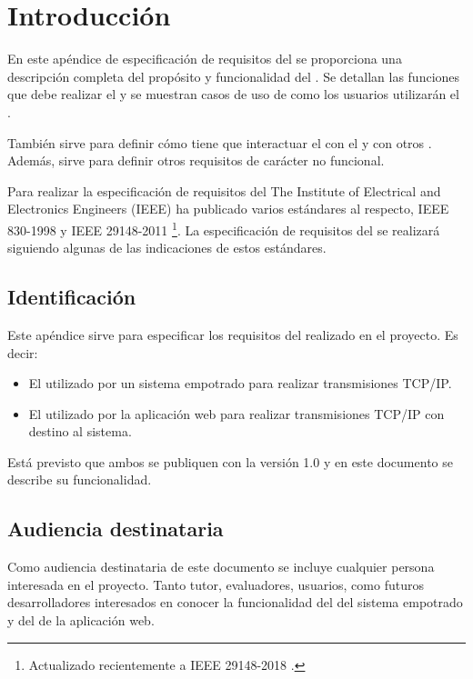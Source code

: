  \label{ch:especificacion}

\section{Introducción} \label{sec:spec-intro}
En este apéndice de especificación de requisitos del 
se proporciona una descripción completa del propósito y funcionalidad del
. Se detallan las funciones que debe realizar el
 y se muestran casos de uso de como los usuarios
utilizarán el .

También sirve para definir cómo tiene que interactuar el 
 con el  y con otros
. Además, sirve para definir otros requisitos de
carácter no funcional.

Para realizar la especificación de requisitos del 
The Institute of Electrical and Electronics Engineers (IEEE) ha publicado
varios estándares al respecto, IEEE 830-1998 \cite{webpage:ieee830-1998}
y IEEE 29148-2011 \cite{webpage:ieee29148-2011} \footnote{Actualizado
recientemente a IEEE 29148-2018 \cite{webpage:ieee29148-2018}.}.
La especificación de requisitos del  se realizará
siguiendo algunas de las indicaciones de estos estándares.

\subsection{Identificación} \label{sec:spec-id}
Este apéndice sirve para especificar los requisitos del 
realizado en el proyecto. Es decir:
\begin{itemize}
  \item El  utilizado por un sistema empotrado para 
  realizar transmisiones TCP/IP.
  \item El  utilizado por la aplicación web para 
  realizar transmisiones TCP/IP con destino al sistema.
\end{itemize}

Está previsto que ambos  se publiquen con la versión
1.0 y en este documento se describe su funcionalidad.

\subsection{Audiencia destinataria}
\label{sec:spec-audiencia}
Como audiencia destinataria de este documento se incluye cualquier persona
interesada en el proyecto. Tanto tutor, evaluadores, usuarios, como futuros
desarrolladores interesados en conocer la funcionalidad del
 del sistema empotrado y del 
de la aplicación web.

